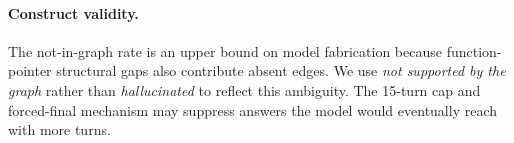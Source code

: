 \paragraph{Construct validity.}
The not-in-graph rate is an upper bound on model fabrication because
function-pointer structural gaps also contribute absent edges.
We use \emph{not supported by the graph} rather than \emph{hallucinated} to
reflect this ambiguity.
The 15-turn cap and forced-final mechanism may suppress answers the model would
eventually reach with more turns.
